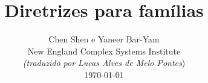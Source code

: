 \documentclass[onecolumn,journal]{IEEEtran}
\begin{document}
\title{\color{Brown} Diretrizes para famílias \\
\vspace{-0.35ex}}
\author{Chen Shen e Yaneer Bar-Yam \\ New England Complex Systems Institute \\
\vspace{+0.35ex}
\small{\textit{(traduzido por Lucas Alves de Melo Pontes})}\\
 \today
  \vspace{-14ex} \\


\bigskip
\bigskip

\textbf{}
 }

\maketitle


\flushbottom %



\thispagestyle{empty} %




\renewcommand{\thefootnote}{\fnsymbol{footnote}}
\end{document}
